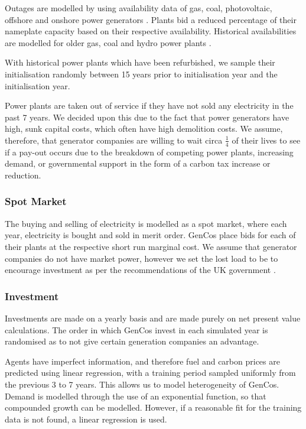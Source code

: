 Outages are modelled by using availability data of gas, coal, photovoltaic, offshore and onshore power generators \cite{Ltd2016, Hunt2015, carroll-j}. Plants bid a reduced percentage of their nameplate capacity based on their respective availability. Historical availabilities are modelled for older gas, coal and hydro power plants \cite{AlbertaSystemElectricOperator2016}.

With historical power plants which have been refurbished, we sample their initialisation randomly between 15 years prior to initialisation year and the initialisation year.

Power plants are taken out of service if they have not sold any electricity in the past 7 years. We decided upon this due to the fact that power generators have high, sunk capital costs, which often have high demolition costs. We assume, therefore, that generator companies are willing to wait circa $\frac{1}{4}$ of their lives to see if a pay-out occurs due to the breakdown of competing power plants, increasing demand, or governmental support in the form of a carbon tax increase or reduction.


\subsubsection{Spot Market}

The buying and selling of electricity is modelled as a spot market, where each year, electricity is bought and sold in merit order. GenCos place bids for each of their plants at the respective short run marginal cost. We assume that generator companies do not have market power, however we set the lost load to be  to encourage investment as per the recommendations of the UK government \cite{DECC2013}.

\subsubsection{Investment}

Investments are made on a yearly basis and are made purely on net present value calculations. The order in which GenCos invest in each simulated year is randomised as to not give certain generation companies an advantage.

Agents have imperfect information, and therefore fuel and carbon prices are predicted using linear regression, with a training period sampled uniformly from the previous 3 to 7 years. This allows us to model heterogeneity of GenCos. Demand is modelled through the use of an exponential function, so that compounded growth can be modelled. However, if a reasonable fit for the training data is not found, a linear regression is used.

